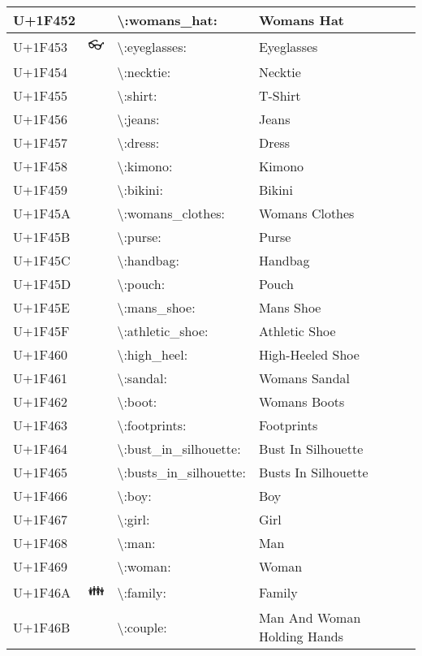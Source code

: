 \begin{table}[h]
\begin{tabulary}{\linewidth}{|L|L|L|L|}
\hline
U+1F452 & 👒 & {\textbackslash}:womans\_hat: & Womans Hat \\
\hline
U+1F453 & 👓 & {\textbackslash}:eyeglasses: & Eyeglasses \\
\hline
U+1F454 & 👔 & {\textbackslash}:necktie: & Necktie \\
\hline
U+1F455 & 👕 & {\textbackslash}:shirt: & T-Shirt \\
\hline
U+1F456 & 👖 & {\textbackslash}:jeans: & Jeans \\
\hline
U+1F457 & 👗 & {\textbackslash}:dress: & Dress \\
\hline
U+1F458 & 👘 & {\textbackslash}:kimono: & Kimono \\
\hline
U+1F459 & 👙 & {\textbackslash}:bikini: & Bikini \\
\hline
U+1F45A & 👚 & {\textbackslash}:womans\_clothes: & Womans Clothes \\
\hline
U+1F45B & 👛 & {\textbackslash}:purse: & Purse \\
\hline
U+1F45C & 👜 & {\textbackslash}:handbag: & Handbag \\
\hline
U+1F45D & 👝 & {\textbackslash}:pouch: & Pouch \\
\hline
U+1F45E & 👞 & {\textbackslash}:mans\_shoe: & Mans Shoe \\
\hline
U+1F45F & 👟 & {\textbackslash}:athletic\_shoe: & Athletic Shoe \\
\hline
U+1F460 & 👠 & {\textbackslash}:high\_heel: & High-Heeled Shoe \\
\hline
U+1F461 & 👡 & {\textbackslash}:sandal: & Womans Sandal \\
\hline
U+1F462 & 👢 & {\textbackslash}:boot: & Womans Boots \\
\hline
U+1F463 & 👣 & {\textbackslash}:footprints: & Footprints \\
\hline
U+1F464 & 👤 & {\textbackslash}:bust\_in\_silhouette: & Bust In Silhouette \\
\hline
U+1F465 & 👥 & {\textbackslash}:busts\_in\_silhouette: & Busts In Silhouette \\
\hline
U+1F466 & 👦 & {\textbackslash}:boy: & Boy \\
\hline
U+1F467 & 👧 & {\textbackslash}:girl: & Girl \\
\hline
U+1F468 & 👨 & {\textbackslash}:man: & Man \\
\hline
U+1F469 & 👩 & {\textbackslash}:woman: & Woman \\
\hline
U+1F46A & 👪 & {\textbackslash}:family: & Family \\
\hline
U+1F46B & 👫 & {\textbackslash}:couple: & Man And Woman Holding Hands \\

\end{tabulary}
\end{table}
